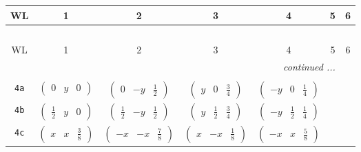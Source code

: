 \documentclass[fleqn,9pt,landscape]{jsarticle}
\begin{document}
\begin{center}
\renewcommand{\arraystretch}{1.2}
\begin{longtable}{ccccccc}
 \hline \hline
WL & 1 & 2 & 3 & 4 & 5 & 6 \\ \hline \endfirsthead

\multicolumn{6}{l}{\tablename\ \thetable{}} \\
 \hline \hline
WL & 1 & 2 & 3 & 4 & 5 & 6 \\ \hline \endhead

 \hline \hline
\multicolumn{6}{r}{\footnotesize\it continued ...} \\ \endfoot

 \hline \hline
\multicolumn{6}{r}{} \\ \endlastfoot

{\tt 4a} & $ \begin{pmatrix} 0 & y & 0 \end{pmatrix} $ & $ \begin{pmatrix} 0 & - y & \frac{1}{2} \end{pmatrix} $ & $ \begin{pmatrix} y & 0 & \frac{3}{4} \end{pmatrix} $ & $ \begin{pmatrix} - y & 0 & \frac{1}{4} \end{pmatrix} $ & $  $ & $  $ \\ \hline
{\tt 4b} & $ \begin{pmatrix} \frac{1}{2} & y & 0 \end{pmatrix} $ & $ \begin{pmatrix} \frac{1}{2} & - y & \frac{1}{2} \end{pmatrix} $ & $ \begin{pmatrix} y & \frac{1}{2} & \frac{3}{4} \end{pmatrix} $ & $ \begin{pmatrix} - y & \frac{1}{2} & \frac{1}{4} \end{pmatrix} $ & $  $ & $  $ \\ \hline
{\tt 4c} & $ \begin{pmatrix} x & x & \frac{3}{8} \end{pmatrix} $ & $ \begin{pmatrix} - x & - x & \frac{7}{8} \end{pmatrix} $ & $ \begin{pmatrix} x & - x & \frac{1}{8} \end{pmatrix} $ & $ \begin{pmatrix} - x & x & \frac{5}{8} \end{pmatrix} $ & $  $ & $  $ \\ \hline

\end{longtable}
\end{center}
\end{document}
